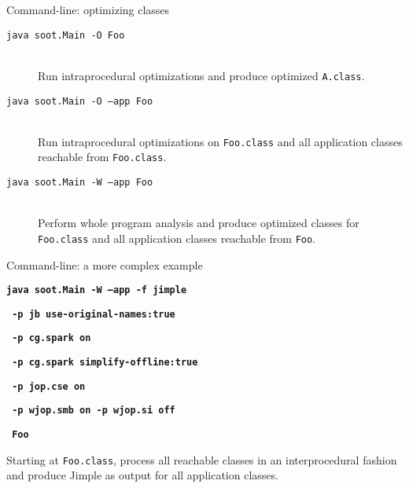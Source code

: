 \begin{slide}{Command-line: optimizing classes}
\begin{description}
\item[\texttt{java soot.Main -O Foo}] \hspace{1in} \\
Run intraprocedural optimizations and produce optimized {\tt A.class}.
\item[\texttt{java soot.Main -O --app Foo}] \hspace{1in} \\
Run intraprocedural optimizations on \texttt{Foo.class} and all
application classes reachable from {\tt Foo.class}. 
\item[\texttt{java soot.Main -W --app Foo}] \hspace{1in} \\
Perform whole program analysis and produce optimized classes for \texttt{Foo.class} and all application classes reachable from {\tt Foo}.
\end{description}
\end{slide}

\begin{slide}{Command-line: a more complex example}

\begin{small}
\textbf{\red\texttt{java soot.Main -W --app -f jimple}}

\textbf{\texttt{     -p jb use-original-names:true }}

\textbf{\texttt{     -p cg.spark on }}

\textbf{\texttt{     -p cg.spark simplify-offline:true}}

\textbf{\texttt{     -p jop.cse on   }}

\textbf{\texttt{     -p wjop.smb on  -p wjop.si off }}

\textbf{\red\texttt{     Foo }}
\end{small}

\vspace{.2in}

Starting at \texttt{Foo.class}, process all reachable classes in an
interprocedural fashion and produce Jimple as output for all application
classes.   
\end{slide}


